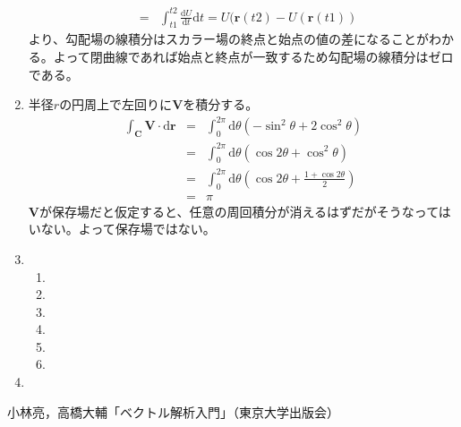 \documentclass{jarticle}
\def\d{\mathrm d}
\begin{document}
\begin{enumerate}
\begin{eqnarray*}
        & = & \int_{t1}^{t2} \frac{\d U}{\d t} \d t = U(\bm r(t2) - U(\bm r(t1))
      \end{eqnarray*}
      より、勾配場の線積分はスカラー場の終点と始点の値の差になることがわかる。よって閉曲線であれば始点と終点が一致するため勾配場の線積分はゼロである。
    \item
      半径$r$の円周上で左回りに$\bm V$を積分する。
      \begin{eqnarray*} 
        \int_{\bm C} \bm V \cdot \d \bm r & = & \int_0^{2\pi} \d \theta ( - \sin^2 \theta + 2 \cos^2 \theta ) \\
        & = & \int_0^{2\pi} \d \theta ( \cos 2\theta + \cos^2 \theta) \\
        & = & \int_0^{2\pi} \d \theta \left( \cos 2\theta + \frac{1+\cos 2\theta}{2} \right) \\
        & = & \pi
      \end{eqnarray*}
      $\bm V$が保存場だと仮定すると、任意の周回積分が消えるはずだがそうなってはいない。よって保存場ではない。
    \item
      \begin{enumerate}
        \item
        \item
        \item
        \item
        \item
        \item
      \end{enumerate}
    \item
      
  \end{enumerate}


\newpage

\begin{thebibliography}{99}
 小林亮，高橋大輔「ベクトル解析入門」（東京大学出版会）
\end{thebibliography}
\end{document}
